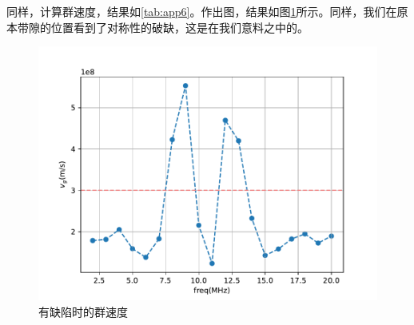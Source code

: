 \documentclass[fleqn,10pt]{SelfArx} %
\begin{document}
同样，计算群速度，结果如\ref{tab:app6}。作出图，结果如图\ref{fig:a4}所示。同样，我们在原本带隙的位置看到了对称性的破缺，这是在我们意料之中的。
\begin{figure}[htbp]
	\centering
	\includegraphics[width=\linewidth]{C4-vg.pdf}
	\caption{有缺陷时的群速度}
	\label{fig:a4}
\end{figure}
\end{document}
